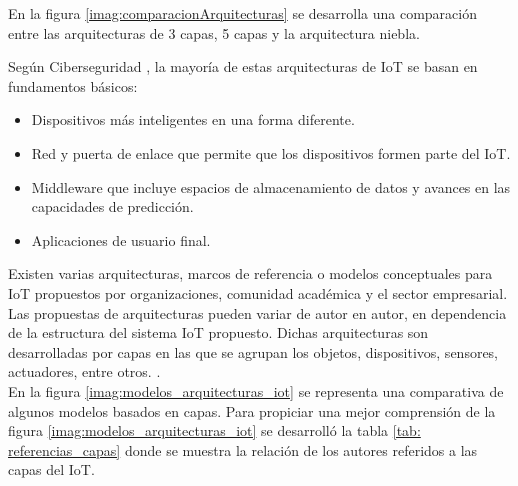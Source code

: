     En la figura \ref{imag:comparacionArquitecturas} se desarrolla una comparación entre las arquitecturas de 3 capas, 5 capas y la arquitectura niebla.

    \newpage

    Según Ciberseguridad \cite{capasIoTciberseguridad}, la mayoría de estas arquitecturas de IoT se basan en fundamentos básicos:
    \begin{itemize}
        \item Dispositivos más inteligentes en una forma diferente.
        \item Red y puerta de enlace que permite que los dispositivos formen parte del IoT.
        \item Middleware que incluye espacios de almacenamiento de datos y avances en las capacidades de predicción.
        \item Aplicaciones de usuario final.
    \end{itemize}

    Existen varias arquitecturas, marcos de referencia o modelos conceptuales para IoT propuestos por organizaciones, comunidad académica y el sector empresarial. Las propuestas de arquitecturas pueden variar de autor en autor, en dependencia de la estructura del sistema IoT propuesto. Dichas arquitecturas son desarrolladas por capas en las que se agrupan los objetos, dispositivos, sensores, actuadores, entre otros. \cite{internetOfThingsStateOfTheArt} \cite{capasIoTciberseguridad}.\\

    En la figura \ref{imag:modelos_arquitecturas_iot} se representa una comparativa de algunos modelos basados en capas. Para propiciar una mejor comprensión de la figura \ref{imag:modelos_arquitecturas_iot} se desarrolló la tabla \ref{tab: referencias_capas} donde se muestra la relación de los autores referidos a las capas del IoT.


